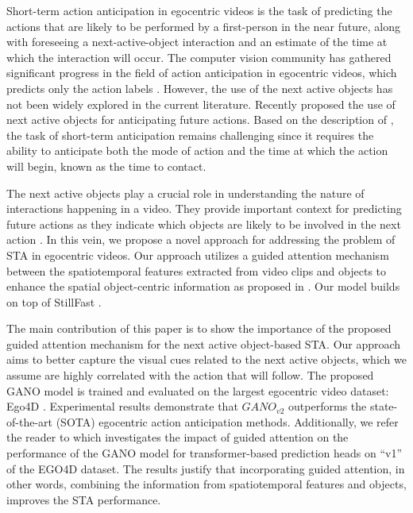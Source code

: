 \documentclass[10pt,twocolumn,letterpaper]{article}
\begin{document}
Short-term action anticipation in egocentric videos is the task of predicting the actions that are likely to be performed by a first-person in the near future, along with foreseeing a next-active-object interaction and an estimate of the time at which the interaction will occur. The computer vision community has gathered significant progress in the field of action anticipation in egocentric videos, which predicts only the action labels \cite{avt,liu2019forecasting,rulstm, memvit2022}. However, the use of the next active objects \cite{anacto,furnari2017next,ADL} has not been widely explored in the current literature. Recently \cite{ego4d} proposed the use of next active objects for anticipating future actions. Based on the description of \cite{ego4d}, the task of short-term anticipation remains challenging since it requires the ability to anticipate both the mode of action and the time at which the action will begin, known as the time to contact.

The next active objects play a crucial role in understanding the nature of interactions happening in a video. They provide important context for predicting future actions as they indicate which objects are likely to be involved in the next action \cite{tpami_contact}. In this vein, we propose a novel approach for addressing the problem of STA in egocentric videos. Our approach utilizes a guided attention mechanism between the spatiotemporal features extracted from video clips and objects to enhance the spatial object-centric information as proposed in \cite{gano}. Our model builds on top of StillFast \cite{ragusa2023stillfast}. 

The main contribution of this paper is to show the importance of the proposed guided attention mechanism for the next active object-based STA. Our approach aims to better capture the visual cues related to the next active objects, which we assume are highly correlated with the action that will follow.
The proposed GANO model is trained and evaluated on the largest egocentric video dataset: Ego4D \cite{ego4d}. Experimental results demonstrate that $GANO_{v2}$ outperforms the state-of-the-art (SOTA) egocentric action anticipation methods. Additionally, we refer the reader to \cite{gano} which investigates the impact of guided attention on the performance of the GANO model for transformer-based prediction heads on ``v1'' of the EGO4D dataset. The results justify that incorporating guided attention, in other words, combining the information from spatiotemporal features and objects, improves the STA performance.
\end{document}
